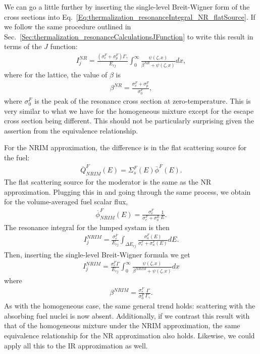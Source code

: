 We can go a little further by inserting the single-level Breit-Wigner form of the cross sections into Eq.~\eqref{Eq:thermalization_resonanceIntegral_NR_flatSource}. If we follow the same procedure outlined in Sec.~\ref{Sec:thermalization_resonanceCalculationsJFunction} to write this result in terms of the $J$ function:
\begin{align}
  I_j^{NR} = \frac{(\sigma_e^F + \sigma_p^F) \Gamma_\gamma }{E_{rj}} \int_0^\infty \frac{ \psi(\zeta,x) }{ \beta^{NR} + \psi(\zeta,x) } dx ,
\end{align}
where for the lattice, the value of $\beta$ is
\begin{align}
  \beta^{NR} = \frac{ \sigma_e^F + \sigma_p^F }{ \sigma_0^F },
\end{align}
where $\sigma_0^F$ is the peak of the resonance cross section at zero-temperature. This is very similar to what we have for the homogeneous mixture except for the escape cross section being different. This should not be particularly surprising given the assertion from the equivalence relationship.

For the NRIM approximation, the difference is in the flat scattering source for the fuel:
\begin{align}
  \overline{Q}_{NRIM}^F(E) = \Sigma_s^F(E) \overline{\phi}^F(E) .
\end{align}
The flat scattering source for the moderator is the same as the NR approximation. Plugging this in and going through the same process, we obtain for the volume-averaged fuel scalar flux,
\begin{align}
  \overline{\phi}^F_{NRIM}(E) = \frac{ \sigma_e^F }{ \sigma_e^F + \sigma_a^E } \frac{1}{E} .
\end{align}
The resonance integral for the lumped systam is then
\begin{align}
  I_j^{NRIM} = \frac{\sigma_e^F}{E_{rj}} \int_{\Delta E_{rj}} \frac{ \sigma_a^F(E) }{ \sigma_e^F + \sigma_a^F(E) } dE. \label{Eq:thermalization_resonanceIntegral_NRIM_flatSource}
\end{align}
Then, inserting the single-level Breit-Wigner formula we get
\begin{align}
  I_j^{NRIM} = \frac{\sigma_e^F \Gamma }{E_{rj}} \int_0^\infty \frac{ \psi(\zeta,x) }{ \beta^{NRIM} + \psi(\zeta,x) } dx 
\end{align}
where
\begin{align}
  \beta^{NRIM} = \frac{\sigma_e^F}{\sigma_0^F} \frac{\Gamma}{\Gamma_\gamma} .
\end{align}
As with the homogeneous case, the same general trend holds: scattering with the absorbing fuel nuclei is now absent. Additionally, if we contrast this result with that of the homogeneous mixture under the NRIM approximation, the same equivalence relationship for the NR approximation also holds. Likewise, we could apply all this to the IR approximation as well.

